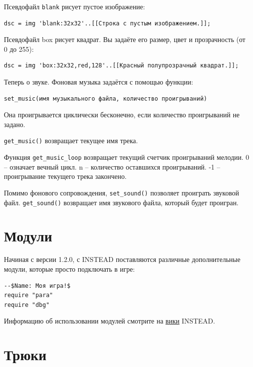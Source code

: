 \documentclass[12pt]{article}
\begin{document}
Псевдофайл \verb/blank/ рисует пустое изображение:

\begin{verbatim}
dsc = img 'blank:32x32'..[[Строка с пустым изображением.]];
\end{verbatim}

Псевдофайл box рисует квадрат. Вы задаёте его размер, цвет и прозрачность (от 0 до 255):

\begin{verbatim}
dsc = img 'box:32x32,red,128'..[[Красный полупрозрачный квадрат.]];
\end{verbatim}

Теперь о звуке. Фоновая музыка задаётся с помощью функции:

\begin{verbatim}
set_music(имя музыкального файла, количество проигрываний)
\end{verbatim}

Она проигрывается циклически бесконечно, если количество проигрываний не задано.

 \verb/get_music()/ возвращает текущее имя трека.

 Функция \verb/get_music_loop/ возвращает текущий счетчик проигрываний мелодии. 0 -- означает вечный цикл. n -- количество оставшихся проигрываний. -1 -- проигрывание текущего трека закончено.

Помимо фонового сопровождения, \verb/set_sound()/ позволяет проиграть звуковой файл. \verb/get_sound()/ возвращает имя звукового файла, который будет проигран.

\section{Модули}
Начиная с версии 1.2.0, с INSTEAD поставляются различные дополнительные модули, которые просто подключать в игре:

\begin{verbatim}
--$Name: Моя игра!$
require "para"
require "dbg"
\end{verbatim}

Информацию об использовании модулей смотрите на \href{http://instead.pinebrush.com/wiki/ru/gamedev/modules}{вики} INSTEAD.

\section{Трюки}
\end{document}
